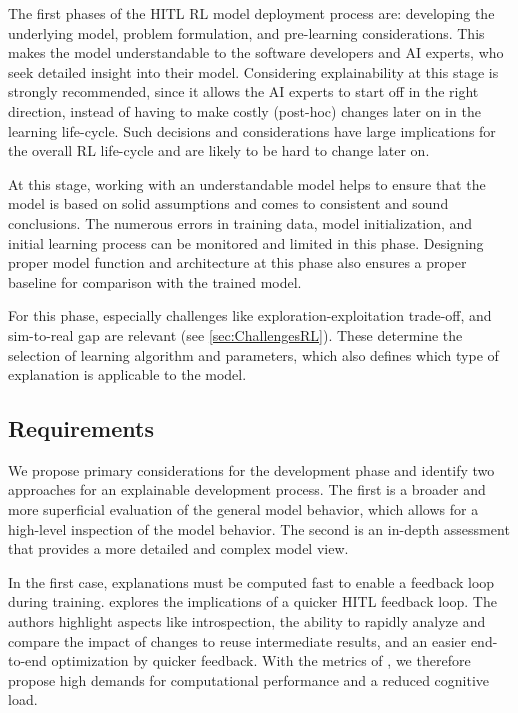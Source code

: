 \documentclass[twoside,11pt]{article}
\begin{document}
The first phases of the HITL RL model deployment process are: developing the underlying model, problem formulation, and pre-learning considerations. This makes the model understandable to the software developers and AI experts, who seek detailed insight into their model. 
Considering explainability at this stage is strongly recommended, since it allows the AI experts to start off in the right direction, instead of having to make costly (post-hoc) changes later on in the learning life-cycle. Such decisions and considerations have large implications for the overall RL life-cycle and are likely to be hard to change later on.

At this stage, working with an understandable model helps to ensure that the model is based on solid assumptions and comes to consistent and sound conclusions. The numerous errors in training data, model initialization, and initial learning process can be monitored and limited in this phase. Designing proper model function and architecture at this phase also ensures a proper baseline for comparison with the trained model.

For this phase, especially challenges like exploration-exploitation trade-off, and sim-to-real gap are relevant (see \ref{sec:ChallengesRL}). These determine the selection of learning algorithm and parameters, which also defines which type of explanation is applicable to the model.

\subsection{Requirements}
We propose primary considerations for the development phase and identify two approaches for an explainable development process. The first is a broader and more superficial evaluation of the general model behavior, which allows for a high-level inspection of the model behavior. The second is an in-depth assessment that provides a more detailed and complex model view.

In the first case, explanations must be computed fast to enable a feedback loop during training. \citet{XinEtAl:2018:HITLMLFeedbackLoop} explores the implications of a quicker HITL feedback loop. The authors highlight aspects like introspection, the ability to rapidly analyze and compare the impact of changes to reuse intermediate results, and an easier end-to-end optimization by quicker feedback. With the metrics of \citet{milani2022survey}, we therefore propose high demands for computational performance and a reduced cognitive load.
\end{document}
